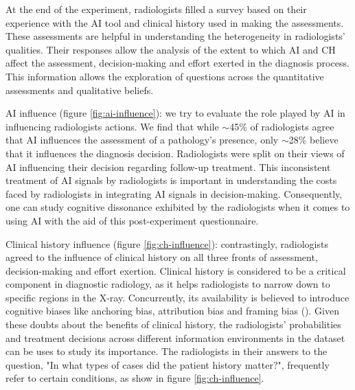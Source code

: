 At the end of the experiment, radiologists filled a survey based on their experience with the AI tool and clinical history used in making the assessments. These assessments are helpful in understanding the heterogeneity in radiologists’ qualities. Their responses allow the analysis of the extent to which AI and CH affect the assessment, decision-making and effort exerted in the diagnosis process. This information allows the exploration of questions across the quantitative assessments and qualitative beliefs.

AI influence (figure \ref{fig:ai-influence}): we try to evaluate the role played by AI in influencing radiologists actions. We find that while $\sim$45\% of radiologists agree that AI influences the assessment of a pathology's presence, only $\sim$28\% believe that it influences the diagnosis decision. Radiologists were split on their views of AI influencing their decision regarding follow-up treatment. This inconsistent treatment of AI signals by radiologists is important in understanding the costs faced by radiologists in integrating AI signals in decision-making. Consequently, one can study cognitive dissonance exhibited by the radiologists when it comes to using AI with the aid of this post-experiment questionnaire.

Clinical history influence (figure \ref{fig:ch-influence}): contrastingly, radiologists agreed to the influence of clinical history on all three fronts of assessment, decision-making and effort exertion. Clinical history is considered to be a critical component in diagnostic radiology, as it helps radiologists to narrow down to specific regions in the X-ray. Concurrently, its availability is believed to introduce cognitive biases like anchoring bias, attribution bias and framing bias (\cite{Yapp2022-tf}). Given these doubts about the benefits of clinical history, the radiologists’ probabilities and treatment decisions across different information environments in the dataset can be uses to study its importance. The radiologists in their answers to the question, "In what types of cases did the patient history matter?", frequently refer to certain conditions, as show in figure \ref{fig:ch-influence}. 